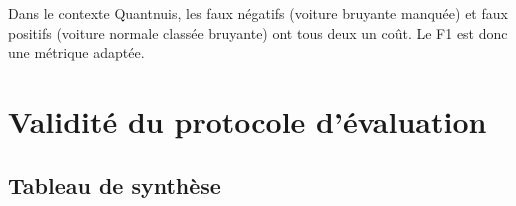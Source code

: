 \documentclass[11pt,a4paper]{article}
\begin{document}
\noindent Dans le contexte Quantnuis, les faux négatifs (voiture bruyante manquée)
et faux positifs (voiture normale classée bruyante) ont tous deux un coût.
Le F1 est donc une métrique adaptée.

\section{Validité du protocole d'évaluation}

\subsection{Tableau de synthèse}
\end{document}
